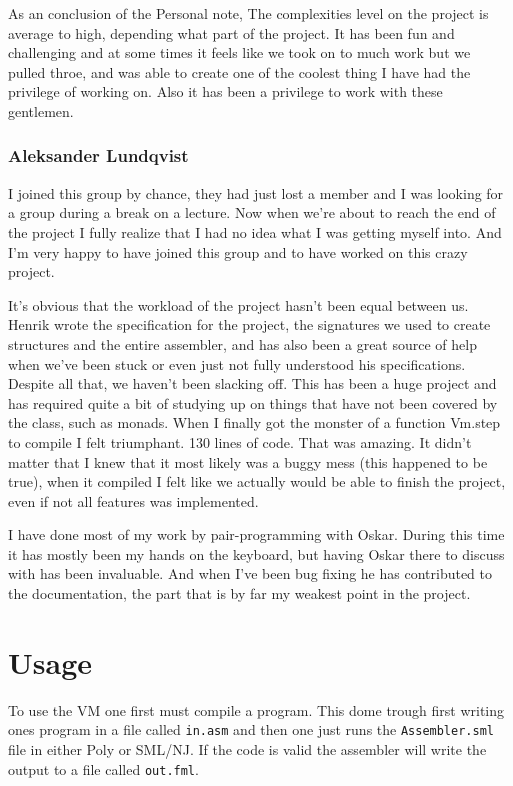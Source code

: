 \documentclass{article}
\newcommand{\V}{\verb}
\begin{document}
As an conclusion of the Personal note,
The complexities level on the project is average to high, depending what part of the project.
It has been fun and challenging and at some times it feels like we took on to much work but we pulled throe, and was able to create one of the coolest thing I have had the privilege of working on. 
Also it has been a privilege to work with these gentlemen.
 
 \subsubsection{Aleksander Lundqvist}
I joined this group by chance, they had just lost a member and I was looking for 
a group during a break on a lecture. Now when we're about to reach the end of 
the project I fully realize that I had no idea what I was getting myself into.
And I'm very happy to have joined this group and to have worked on this crazy project.

It's obvious that the workload of the project hasn't been equal between us. 
Henrik wrote the specification for the project, the signatures we used to 
create structures and the entire assembler, and has also been a great source 
of help when we've been stuck or even just not fully understood his specifications. 
Despite all that, we haven't been slacking off. This has been a huge project and has
required quite a bit of studying up on things that have not been covered by the class,
such as monads. When I finally got the monster of a function Vm.step to compile 
I felt triumphant. 130 lines of code. That was amazing. It didn't matter that I 
knew that it most likely was a buggy mess (this happened to be true), when it 
compiled I felt like we actually would be able to finish the project, even if 
not all features was implemented.

I have done most of my work by pair-programming with Oskar.
During this time it has mostly been my hands on the keyboard, 
but having Oskar there to discuss with has been invaluable. 
And when I've been bug fixing he has contributed to the documentation, 
the part that is by far my weakest point in the project. 

\section{Usage}
To use the VM one first must compile a program. This dome trough first writing
ones program in a file called \V+in.asm+ and then one just runs the
\V+Assembler.sml+ file in either Poly or SML/NJ. If the code is valid the
assembler will write the output to a file called \V+out.fml+.
\end{document}
